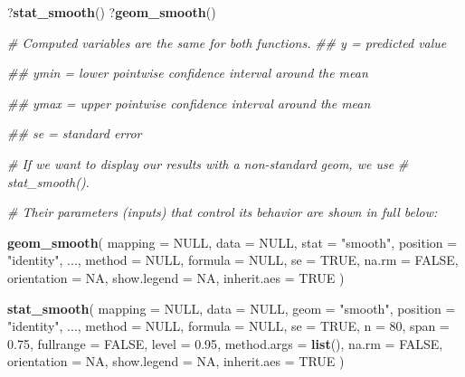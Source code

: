 \documentclass[
]{article}
\newenvironment{Shaded}{\begin{snugshade}}{\end{snugshade}}
\newcommand{\CommentTok}[1]{\textcolor[rgb]{0.56,0.35,0.01}{\textit{#1}}}
\newcommand{\DataTypeTok}[1]{\textcolor[rgb]{0.13,0.29,0.53}{#1}}
\newcommand{\DecValTok}[1]{\textcolor[rgb]{0.00,0.00,0.81}{#1}}
\newcommand{\FloatTok}[1]{\textcolor[rgb]{0.00,0.00,0.81}{#1}}
\newcommand{\KeywordTok}[1]{\textcolor[rgb]{0.13,0.29,0.53}{\textbf{#1}}}
\newcommand{\NormalTok}[1]{#1}
\newcommand{\OtherTok}[1]{\textcolor[rgb]{0.56,0.35,0.01}{#1}}
\newcommand{\StringTok}[1]{\textcolor[rgb]{0.31,0.60,0.02}{#1}}
\begin{document}
\begin{Shaded}
\begin{Highlighting}[]
\NormalTok{?}\KeywordTok{stat_smooth}\NormalTok{()}
\NormalTok{?}\KeywordTok{geom_smooth}\NormalTok{()}

\CommentTok{# Computed variables are the same for both functions.}
\CommentTok{## y = predicted value}

\CommentTok{## ymin = lower pointwise confidence interval around the mean}

\CommentTok{## ymax = upper pointwise confidence interval around the mean}

\CommentTok{## se = standard error}

\CommentTok{# If we want to display our results with a non-standard geom, we use}
\CommentTok{# stat_smooth().}

\CommentTok{# Their parameters (inputs) that control its behavior are shown in full below:}

\KeywordTok{geom_smooth}\NormalTok{(}
  \DataTypeTok{mapping =} \OtherTok{NULL}\NormalTok{,}
  \DataTypeTok{data =} \OtherTok{NULL}\NormalTok{,}
  \DataTypeTok{stat =} \StringTok{"smooth"}\NormalTok{,}
  \DataTypeTok{position =} \StringTok{"identity"}\NormalTok{,}
\NormalTok{  ...,}
  \DataTypeTok{method =} \OtherTok{NULL}\NormalTok{,}
  \DataTypeTok{formula =} \OtherTok{NULL}\NormalTok{,}
  \DataTypeTok{se =} \OtherTok{TRUE}\NormalTok{,}
  \DataTypeTok{na.rm =} \OtherTok{FALSE}\NormalTok{,}
  \DataTypeTok{orientation =} \OtherTok{NA}\NormalTok{,}
  \DataTypeTok{show.legend =} \OtherTok{NA}\NormalTok{,}
  \DataTypeTok{inherit.aes =} \OtherTok{TRUE}
\NormalTok{)}

\KeywordTok{stat_smooth}\NormalTok{(}
  \DataTypeTok{mapping =} \OtherTok{NULL}\NormalTok{,}
  \DataTypeTok{data =} \OtherTok{NULL}\NormalTok{,}
  \DataTypeTok{geom =} \StringTok{"smooth"}\NormalTok{,}
  \DataTypeTok{position =} \StringTok{"identity"}\NormalTok{,}
\NormalTok{  ...,}
  \DataTypeTok{method =} \OtherTok{NULL}\NormalTok{,}
  \DataTypeTok{formula =} \OtherTok{NULL}\NormalTok{,}
  \DataTypeTok{se =} \OtherTok{TRUE}\NormalTok{,}
  \DataTypeTok{n =} \DecValTok{80}\NormalTok{,}
  \DataTypeTok{span =} \FloatTok{0.75}\NormalTok{,}
  \DataTypeTok{fullrange =} \OtherTok{FALSE}\NormalTok{,}
  \DataTypeTok{level =} \FloatTok{0.95}\NormalTok{,}
  \DataTypeTok{method.args =} \KeywordTok{list}\NormalTok{(),}
  \DataTypeTok{na.rm =} \OtherTok{FALSE}\NormalTok{,}
  \DataTypeTok{orientation =} \OtherTok{NA}\NormalTok{,}
  \DataTypeTok{show.legend =} \OtherTok{NA}\NormalTok{,}
  \DataTypeTok{inherit.aes =} \OtherTok{TRUE}
\NormalTok{)}
\end{Highlighting}
\end{Shaded}
\end{document}
